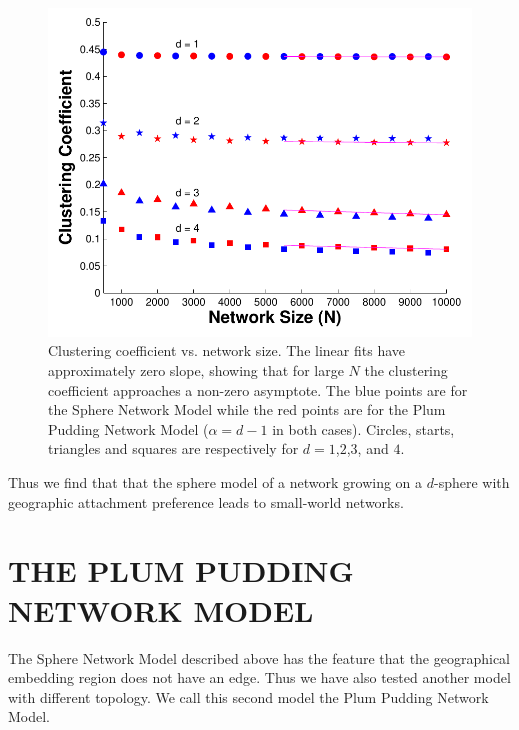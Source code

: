 \documentclass[aps,pre,manuscript,superscriptaddress,amsmath,amssymb,nofootinbib]{revtex4-1}
\begin{document}
\begin{itemize}
\begin{figure}
\includegraphics[width=\linewidth]{figures/figCvsN.pdf}
\caption{\label{clustN}Clustering coefficient vs. network size. The linear fits have approximately zero slope, showing that for large $N$ the clustering coefficient approaches a non-zero asymptote. The blue points are for the Sphere Network Model while the red points are for the Plum Pudding Network Model ($\alpha = d-1$ in both cases). Circles, starts, triangles and squares are respectively for $d = 1$,$2$,$3$, and $4$.}
\end{figure}

\end{itemize}
Thus we find that that the sphere model of a network growing on a $d$-sphere with geographic attachment preference leads to small-world networks.

\section{THE PLUM PUDDING NETWORK MODEL}
The Sphere Network Model described above has the feature that the geographical embedding region does not have an edge.
Thus we have also tested another model with different topology.
We call this second model the Plum Pudding Network Model.
\end{document}
